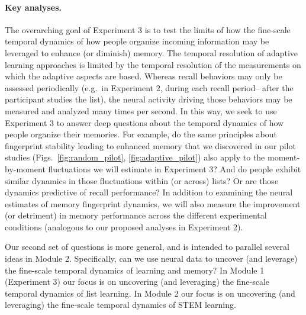 \paragraph{Key analyses.}  The overarching goal of Experiment 3 is to test the limits of how the fine-scale temporal dynamics of how people organize incoming information may be leveraged to enhance (or diminish) memory.  The temporal resolution of adaptive learning approaches is limited by the temporal resolution of the measurements on which the adaptive aspects are based.  Whereas recall behaviors may only be assessed periodically (e.g.\ in Experiment 2, during each recall period-- after the participant studies the list), the neural activity driving those behaviors may be measured and analyzed many times per second.  In this way, we seek to use Experiment 3 to answer deep questions about the temporal dynamics of how people organize their memories.  For example, do the same principles about fingerprint stability leading to enhanced memory that we discovered in our pilot studies (Figs.~\ref{fig:random_pilot}, \ref{fig:adaptive_pilot}) also apply to the moment-by-moment fluctuations we will estimate in Experiment 3?  And do people exhibit similar dynamics in those fluctuations within (or across) lists?  Or are those dynamics predictive of recall performance?  In addition to examining the neural estimates of memory fingerprint dynamics, we will also measure the improvement (or detriment) in memory performance across the different experimental conditions (analogous to our proposed analyses in Experiment 2).

Our second set of questions is more general, and is intended to parallel several ideas in Module 2.  Specifically, can we use neural data to uncover (and leverage) the fine-scale temporal dynamics of learning and memory?  In Module 1 (Experiment 3) our focus is on uncovering (and leveraging) the fine-scale temporal dynamics of list learning.  In Module 2 our focus is on uncovering (and leveraging) the fine-scale temporal dynamics of STEM learning.